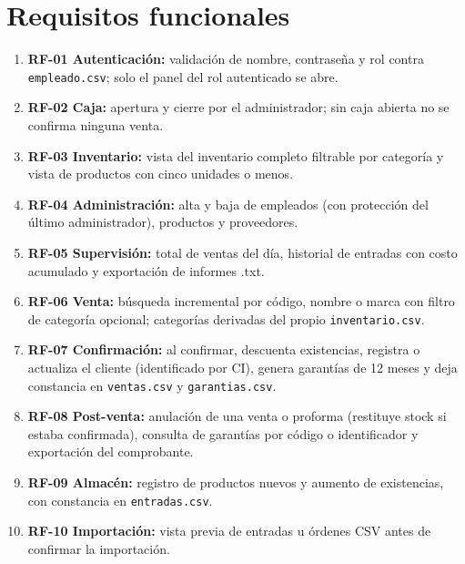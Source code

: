 \section{Requisitos funcionales}
\begin{enumerate}
\item \textbf{RF-01 Autenticación:} validación de nombre, contraseña y rol contra \texttt{empleado.csv}; solo el panel del rol autenticado se abre.
\item \textbf{RF-02 Caja:} apertura y cierre por el administrador; sin caja abierta no se confirma ninguna venta.
\item \textbf{RF-03 Inventario:} vista del inventario completo filtrable por categoría y vista de productos con cinco unidades o menos.
\item \textbf{RF-04 Administración:} alta y baja de empleados (con protección del último administrador), productos y proveedores.
\item \textbf{RF-05 Supervisión:} total de ventas del día, historial de entradas con costo acumulado y exportación de informes .txt.
\item \textbf{RF-06 Venta:} búsqueda incremental por código, nombre o marca con filtro de categoría opcional; categorías derivadas del propio \texttt{inventario.csv}.
\item \textbf{RF-07 Confirmación:} al confirmar, descuenta existencias, registra o actualiza el cliente (identificado por CI), genera garantías de 12 meses y deja constancia en \texttt{ventas.csv} y \texttt{garantias.csv}.
\item \textbf{RF-08 Post-venta:} anulación de una venta o proforma (restituye stock si estaba confirmada), consulta de garantías por código o identificador y exportación del comprobante.
\item \textbf{RF-09 Almacén:} registro de productos nuevos y aumento de existencias, con constancia en \texttt{entradas.csv}.
\item \textbf{RF-10 Importación:} vista previa de entradas u órdenes CSV antes de confirmar la importación.
\end{enumerate}

